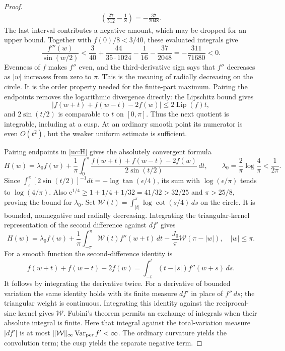 \begin{proof}
\[\begin{aligned}
                    \left(\frac{27}{512}-\frac18\right)
 =-\frac{37}{2048}.
 \end{aligned}
\]
The last interval contributes a negative amount, which may be dropped
for an upper bound. Together with $f(0)/8<3/40$, these evaluated
integrals give
\[
 \frac{f'''(w)}{\sin(w/2)}
 <\frac3{40}+\frac{44}{35\cdot1024}-\frac1{16}-\frac{37}{2048}
 =-\frac{311}{71680}<0.
\]
Evenness of $f$ makes $f''$ even, and the third-derivative sign says
that $f''$ decreases as
$|w|$ increases from zero to $\pi$. This is the meaning of radially
decreasing on the circle. It is the order property needed for the
finite-part maximum. Pairing the endpoints removes the logarithmic
divergence directly: the Lipschitz bound gives
\[
 |f(w+t)+f(w-t)-2f(w)|\leq2\operatorname{Lip}(f)t,
\]
and $2\sin(t/2)$ is comparable to $t$ on $[0,\pi]$. Thus the next
quotient is integrable, including at a cusp. At an ordinary smooth
point its numerator is even $O(t^2)$, but the weaker uniform estimate
is sufficient.

Pairing endpoints in \eqref{uc:H} gives the absolutely convergent
formula
\[
 H(w)=\lambda_0f(w)+\frac1\pi\int_0^\pi
 \frac{f(w+t)+f(w-t)-2f(w)}{2\sin(t/2)}\,dt,
 \qquad \lambda_0=\frac2\pi\log\frac4\pi<\frac1{2\pi}.
\]
Since $\int_\epsilon^\pi[2\sin(t/2)]^{-1}dt=-\log\tan(\epsilon/4)$,
its sum with $\log(\epsilon/\pi)$ tends to $\log(4/\pi)$.
Also $\mathrm e^{1/4}\geq1+1/4+1/32=41/32>32/25$ and
$\pi>25/8$, proving the bound for $\lambda_0$.
Set $\mathcal{W}(t)=\int_{|t|}^\pi\log\cot(s/4)\,ds$ on the circle.
It is bounded, nonnegative and radially decreasing. Integrating the
triangular-kernel representation of the second difference against
$df'$ gives
\[
 H(w)=\lambda_0f(w)+\frac1\pi\int_{-\pi}^{\pi}\mathcal{W}(t)f''(w+t)\,dt
                  -\frac{J_0}\pi \mathcal{W}(\pi-|w|),\quad |w|\leq\pi.
\]
For a smooth function the second-difference identity is
\[
 f(w+t)+f(w-t)-2f(w)
 =\int_{-t}^{t}(t-|s|)f''(w+s)\,ds.
\]
It follows by integrating the derivative twice. For a derivative of
bounded variation the same identity holds with its finite measure
$df'$ in place of $f''\,ds$; the triangular weight is continuous.
Integrating this identity against the reciprocal-sine kernel gives
$\mathcal{W}$. Fubini's theorem permits an exchange of integrals when
their absolute integral is finite. Here that integral against the
total-variation measure $|df'|$ is at most
$\|\mathcal W\|_\infty\operatorname{Var}_{\rm per}f'<\infty$.
The ordinary curvature yields the
convolution term; the cusp yields the separate negative term.


\end{proof}
